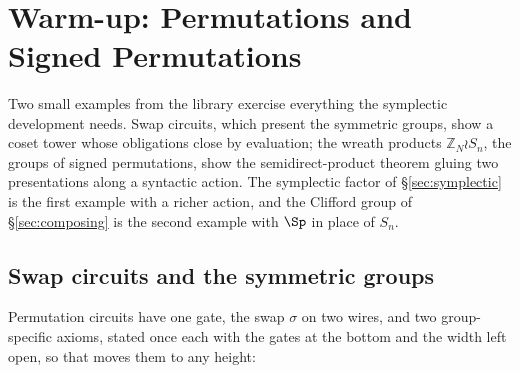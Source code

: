 \begin{code}[hide]
\AgdaSymbol{:}\AgdaSpace{}%
\AgdaSpace{}%
\AgdaSymbol{\{}\AgdaSymbol{\}}\AgdaSpace{}%
\AgdaSpace{}%
\AgdaSpace{}%
\AgdaSpace{}%
\AgdaSpace{}%
\AgdaSpace{}%
\AgdaSpace{}%
\AgdaSpace{}%
\<%
\\
%
\\[\AgdaEmptyExtraSkip]%
\>[0]\AgdaSpace{}%
\AgdaSpace{}%
\<%
\\
\>[0][@{}l@{\AgdaIndent{0}}]%
\>[2]\AgdaSpace{}%
\AgdaSpace{}%
\AgdaSymbol{:}\AgdaSpace{}%
\AgdaSpace{}%
\AgdaSpace{}%
\AgdaSpace{}%
\AgdaSpace{}%
\<%
\end{code}
\section{Warm-up: Permutations and Signed Permutations}\label{sec:warmup}

Two small examples from the library exercise everything the symplectic
development needs.  Swap circuits, which present the symmetric groups,
show a coset tower whose obligations close by evaluation; the wreath
products $\mathbb{Z}_N \wr S_n$, the groups of signed permutations, show
the semidirect-product theorem gluing two presentations along a
syntactic action.  The symplectic factor of \S\ref{sec:symplectic} is
the first example with a richer action, and the Clifford group of
\S\ref{sec:composing} is the second example with $\Sp$ in place of
$S_n$.

\subsection{Swap circuits and the symmetric groups}\label{sec:sn}

Permutation circuits have one gate, the swap $\sigma$ on two wires, and
two group-specific axioms, stated once each with the gates at the bottom
and the width left open, so that  moves them to any height:

